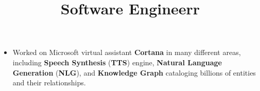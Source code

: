 \begin{resume}
\title{Software Engineer}
\begin{position}
\vspace*{-8pt}
\begin{itemize}
\item Worked on Microsoft virtual assistant \textbf{Cortana} in many different areas, including \textbf{Speech Synthesis} (\textbf{TTS}) engine, \textbf{Natural Language Generation} (\textbf{NLG}), and \textbf{Knowledge Graph} cataloging billions of entities and their relationships.
\end{itemize} 
\end{position}


\begin{formatb}
  \title{r}\\
  \\
  \body\\
\end{formatb}


\end{resume}
